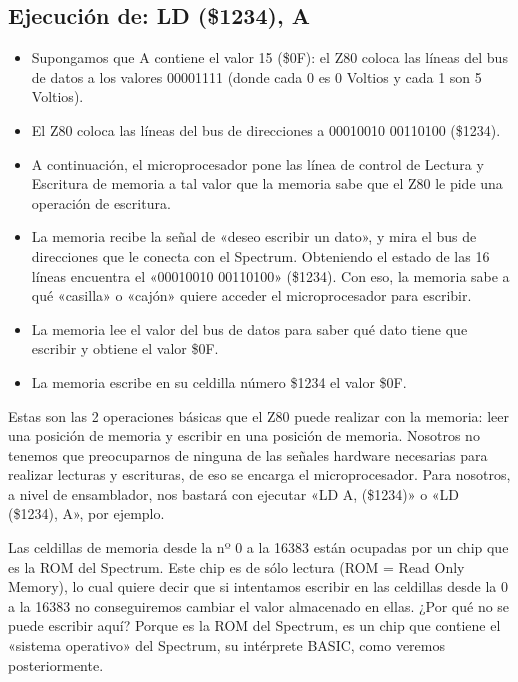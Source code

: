 \documentclass[letterpaper,10pt,spanish]{sphinxmanual}
\begin{document}
\subsection{Ejecución de: LD (\$1234), A}
\label{\detokenize{03_arquitectura/arquitectura:ejecucion-de-ld-1234-a}}\begin{itemize}
\item {} 
Supongamos que A contiene el valor 15 (\$0F): el Z80 coloca las líneas del bus de datos a los valores 00001111 (donde cada 0 es 0 Voltios y cada 1 son 5 Voltios).

\item {} 
El Z80 coloca las líneas del bus de direcciones a 00010010 00110100 (\$1234).

\item {} 
A continuación, el microprocesador pone las línea de control de Lectura y Escritura de memoria a tal valor que la memoria sabe que el Z80 le pide una operación de escritura.

\item {} 
La memoria recibe la señal de «deseo escribir un dato», y mira el bus de direcciones que le conecta con el Spectrum. Obteniendo el estado de las 16 líneas encuentra el «00010010 00110100» (\$1234). Con eso, la memoria sabe a qué «casilla» o «cajón» quiere acceder el microprocesador para escribir.

\item {} 
La memoria lee el valor del bus de datos para saber qué dato tiene que escribir y obtiene el valor \$0F.

\item {} 
La memoria escribe en su celdilla número \$1234 el valor \$0F.

\end{itemize}

Estas son las 2 operaciones básicas que el Z80 puede realizar con la memoria: leer una posición de memoria y escribir en una posición de memoria. Nosotros no tenemos que preocuparnos de ninguna de las señales hardware necesarias para realizar lecturas y escrituras, de eso se encarga el microprocesador. Para nosotros, a nivel de ensamblador, nos bastará con ejecutar «LD A, (\$1234)» o «LD (\$1234), A», por ejemplo.

Las celdillas de memoria desde la nº 0 a la 16383 están ocupadas por un chip que es la ROM del Spectrum. Este chip es de sólo lectura (ROM = Read Only Memory), lo cual quiere decir que si intentamos escribir en las celdillas desde la 0 a la 16383 no conseguiremos cambiar el valor almacenado en ellas. ¿Por qué no se puede escribir aquí? Porque es la ROM del Spectrum, es un chip que contiene el «sistema operativo» del Spectrum, su intérprete BASIC, como veremos posteriormente.
\end{document}
